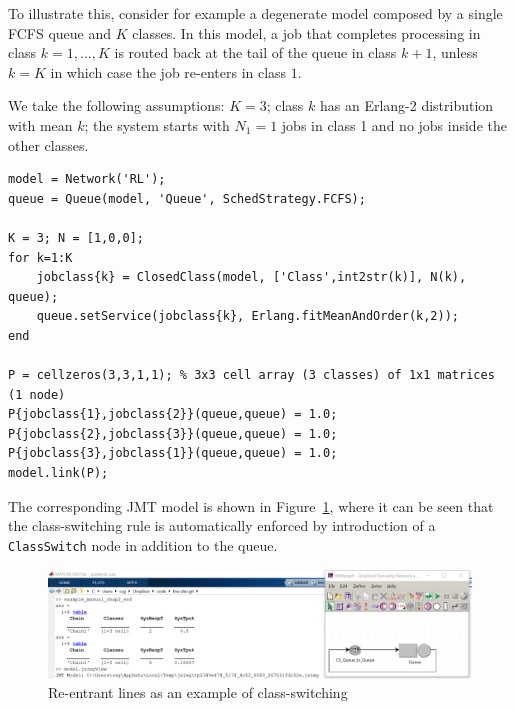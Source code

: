 To illustrate this, consider for example a degenerate model composed by a single FCFS queue and $K$ classes. In this model, a job that completes processing in class $k=1,...,K$ is routed back at the tail of the queue in class $k+1$, unless $k=K$ in which case the job re-enters in class $1$.

We take the following assumptions: $K=3$; class $k$ has an Erlang-2 distribution with mean $k$; the system starts with $N_1=1$ jobs in class 1 and no jobs inside the other classes.

\begin{lstlisting}
model = Network('RL');
queue = Queue(model, 'Queue', SchedStrategy.FCFS);

K = 3; N = [1,0,0];
for k=1:K
    jobclass{k} = ClosedClass(model, ['Class',int2str(k)], N(k), queue);
    queue.setService(jobclass{k}, Erlang.fitMeanAndOrder(k,2));
end

P = cellzeros(3,3,1,1); % 3x3 cell array (3 classes) of 1x1 matrices (1 node)
P{jobclass{1},jobclass{2}}(queue,queue) = 1.0;
P{jobclass{2},jobclass{3}}(queue,queue) = 1.0;
P{jobclass{3},jobclass{1}}(queue,queue) = 1.0;
model.link(P);
\end{lstlisting}
The corresponding JMT model is shown in Figure~\ref{FIG:jsimgViewCS}, where it can be seen that the class-switching rule is automatically enforced by introduction of a \texttt{ClassSwitch} node in addition to the queue.
\begin{figure}[h!t]
  \centering
  \includegraphics[width=14cm]{./images/jsimgViewCS.png}
  \caption{Re-entrant lines as an example of class-switching}
  \label{FIG:jsimgViewCS}
\end{figure}

